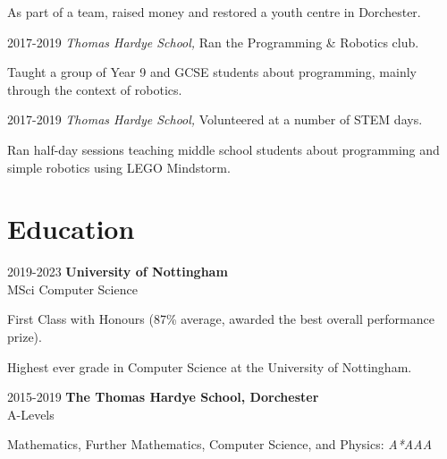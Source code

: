 \documentclass[12pt]{article}
\begin{document}
\begin{explist}
	{\small \begin{explist}
		\item As part of a team, raised money and restored a youth centre in Dorchester.
	\end{explist}}
	\item[2017-2019] \textit{Thomas Hardye School,} Ran the Programming \& Robotics club.
	{\small \begin{explist}
		\item Taught a group of Year 9 and GCSE students about programming, mainly through the context of robotics.
	\end{explist}}
	\item[2017-2019] \textit{Thomas Hardye School,} Volunteered at a number of STEM days.
	{\small \begin{explist}
		\item Ran half-day sessions teaching middle school students about programming and simple robotics using LEGO Mindstorm.
	\end{explist}}
\end{explist}

\section*{Education}

\begin{explist}
	\item[2019-2023] \textbf{University of Nottingham} \\
		  MSci Computer Science
		  {\small
		  \begin{explist}
		  	\item[] First Class with Honours (87\% average, awarded the best overall performance prize).
			\item[] Highest ever grade in Computer Science at the University of Nottingham.
		  \end{explist}
		  }
		  
	\item[2015-2019] \textbf{The Thomas Hardye School, Dorchester } \\
		A-Levels
		{\small
		\begin{explist}
			\item[] Mathematics, Further Mathematics, Computer Science, and Physics: \textit{A*AAA}
		\end{explist}
		}
\end{explist}
\end{document}
